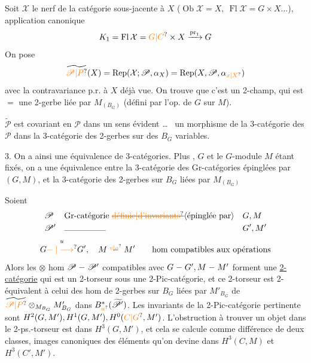 Soit $\mathcal X$ le nerf de la catégorie  sous-jacente à $X$
($\operatorname{Ob}\mathcal X=X,\ \operatorname{Fl}\mathcal X=G\times X\ldots$), application canonique
\[
K_1=\operatorname{Fl}\mathcal X=\unsure{G|C}\times X\xrightarrow{\mathrm{pr}_1}G
\]
On pose
\[
\widetilde{\unsure{\mathscr P|P}}(X)=\operatorname{Rep}(\mathcal X;\mathscr P,\alpha_X)=\operatorname{Rep}(X,\mathscr P,\alpha_{\unsure{x|X}})
\]
avec la contravariance p.r. à $X$ déjà vue. On trouve que c'est un 2-champ, qui est $=$ une 2-gerbe liée par $M_{(B_G)}$  (défini par l'op. de $G$ sur $M$).

 \uline{} $\widetilde{\mathscr P}$ est covariant en $\mathscr P$ dans un sens évident \ldots\  un morphisme de la 3-catégorie des  $\mathscr P$ dans la 3-catégorie des 2-gerbes sur des $B_G$ variables.

3. On a ainsi une équivalence de 3-catégories. Plus , $G$ et le $G$-module $M$ étant fixés, on a une équivalence entre la 3-catégorie des Gr-catégories  épinglées par $(G,M)$, et la 3-catégorie des 2-gerbes sur $B_G$ liées par $M_{(B_G)}$

Soient
\[
\begin{aligned}
&\mathscr P &&\text{Gr-catégorie }\deleted{\unsure{\text{définie}|\text{d'invariants}}}\inserted{\text{épinglée par}} &&G,M\\
&\mathscr P' &&\rule{5em}{.3pt} &&G',M'
\end{aligned}
\]
\[
G\overset{u}{\unsure{\relbar|\longrightarrow}}G',\quad M\overset{\unsure{v|o}}{\relbar}M'\qquad\text{hom compatibles aux opérations}
\]
Alors les $\otimes$ hom $\mathscr P\relbar\mathscr P'$ compatibles avec $G\relbar G', M\relbar M'$ forment une \uline{2-catégorie}
qui est un 2-torseur sous une 2-Pic-catégorie, et ce 2-torseur est 2-équivalent à celui des hom de 2-gerbes sur $B_G$ liées par $M'_{B_G}$ de
$\widetilde{\unsure{\mathscr P|P}}\otimes_{M_{B_G}}M'_{B_G}$ dans $B_{\unsure{u}}^*(\widetilde{\mathscr P}')$. Les invariants de la 2-Pic-catégorie pertinente sont $H^2(G,M'),H^1(G,M'),H^0(\unsure{C|G},M')$. L'obstruction à trouver un objet dans le 2-ps.-torseur est dans $H^3(G,M')$, et cela se calcule comme différence de deux classes, images canoniques des éléments qu'on devine dans $H^3(C,M)$ et $H^3(C',M')$.

